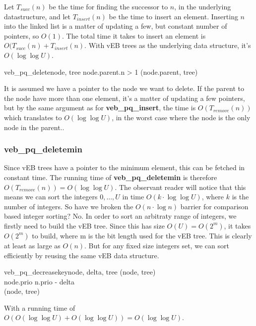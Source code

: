 Let $T_{succ}(n)$ be the time for finding the successor to $n$, in the underlying datastructure, and let $T_{insert}(n)$ be the time to insert an element. Inserting $n$ into the linked list is a matter of updating a few, but constant number of pointers, so $O(1)$. The total time it takes to insert an element is $O(T_{succ}(n) + T_{insert}(n)$. With vEB trees as the underlying data structure, it's $O(\log \log U)$.

\begin{pseudocode}[Ovalbox]{veb\_pq\_delete}{node, tree}
\IF node.parent.n > 1
\THEN {}
\ELSE {}(node.parent, tree)
\end{pseudocode}

It is assumed we have a pointer to the node we want to delete. If the parent to the node have more than one element, it's a matter of updating a few pointers, but by the same argument as for \textbf{veb\_pq\_insert}, the time is $O(T_{remove}(n))$ which translates to $O(\log \log U)$, in the worst case where the node is the only node in the parent..

\subsubsection*{\textbf{veb\_pq\_deletemin}}
Since vEB trees have a pointer to the minimum element, this can be fetched in constant time. The running time of \textbf{veb\_pq\_deletemin} is therefore $O(T_{remove}(n)) = O(\log \log U)$. The observant reader will notice that this means we can sort the integers $0, \dots, U$ in time $O(k \cdot \log \log U)$, where $k$ is the number of integers. So have we broken the $O(n \cdot \log n)$ barrier for comparison based integer sorting? No. In order to sort an arbitraty range of integers, we firstly need to build the vEB tree. Since this has size $O(U) = O(2^m)$, it takes $O(2^m)$ to build, where m is the bit length used for the vEB tree. This is clearly at least as large as $O(n)$. But for any fixed size integers set, we can sort efficiently by reusing the same vEB data structure.

\begin{pseudocode}[Ovalbox]{veb\_pq\_decreasekey}{node, delta, tree}
(node, tree)\\
node.prio \GETS n.prio - delta\\
(node, tree)
\end{pseudocode}

With a running time of $O(O(\log \log U) + O(\log \log U)) = O(\log \log U)$.

